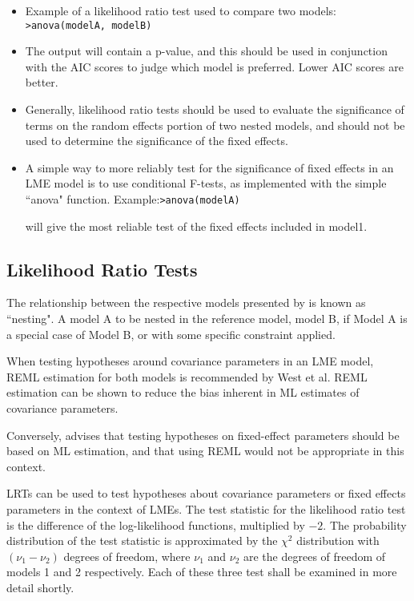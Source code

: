 \documentclass[12pt, a4paper]{report}
\theoremstyle{plain}
\theoremstyle{definition}
\theoremstyle{remark}
\begin{document}
\begin{itemize}
	\item Example of a likelihood ratio test used to compare two models: \newline \texttt{>anova(modelA, modelB)}
	
	\item The output will contain a p-value, and this should be used in conjunction with the AIC scores to judge which model is preferred. Lower AIC scores are better.
	
	\item Generally, likelihood ratio tests should be used to evaluate the significance of terms on the
	random effects portion of two nested models, and should not be used to determine the significance of the fixed effects.
	\item A simple way to more reliably test for the significance of fixed effects in an LME model is to use
	conditional F-tests, as implemented with the simple ``anova" function.
	Example:\newline \texttt{>anova(modelA)}
	
	
	will give the most reliable test of the fixed effects included in model1.
\end{itemize}


\subsection{Likelihood Ratio Tests}
The relationship between the respective models presented by \citet{ARoy2009} is known as ``nesting".
A model A to be nested in the reference model, model B, if Model A is a special case
of Model B, or with some specific constraint applied.


When testing hypotheses around covariance parameters in an LME model, REML estimation for both models is recommended by West et al. REML estimation can be shown to reduce the bias inherent in ML estimates of covariance parameters.

Conversely, \citet{ARoy2009} advises that testing hypotheses on fixed-effect parameters should be based on ML estimation, and that using REML would not be appropriate in this
context.

LRTs can be used to test hypotheses about covariance parameters or fixed effects
parameters in the context of LMEs. The test statistic for the likelihood ratio test
is the difference of the log-likelihood functions, multiplied by $-2$. The probability
distribution of the test statistic is approximated by the $\chi^2$ distribution with $(\nu_1 - \nu_2)$
degrees of freedom, where $\nu_1$ and $\nu_2$ are the degrees of freedom of models 1 and 2
respectively. Each of these three test shall be examined in more detail shortly.
\end{document}
